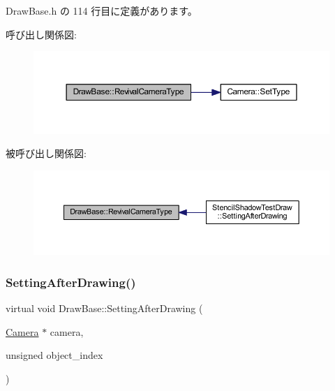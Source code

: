  Draw\+Base.\+h の 114 行目に定義があります。

呼び出し関係図\+:\nopagebreak
\begin{figure}[H]
\begin{center}
\leavevmode
\includegraphics[width=350pt]{class_draw_base_a48b144e61928b7658c7a849017e40c79_cgraph}
\end{center}
\end{figure}
被呼び出し関係図\+:\nopagebreak
\begin{figure}[H]
\begin{center}
\leavevmode
\includegraphics[width=350pt]{class_draw_base_a48b144e61928b7658c7a849017e40c79_icgraph}
\end{center}
\end{figure}
\mbox{\label{class_draw_base_afe64f27b0bbf8c45da7aa0de4c3f3d65}} 
\subsubsection{\texorpdfstring{Setting\+After\+Drawing()}{SettingAfterDrawing()}}
{\footnotesize\ttfamily virtual void Draw\+Base\+::\+Setting\+After\+Drawing (\begin{DoxyParamCaption}\item[{\mbox{\hyperlink{class_camera}{Camera}} $\ast$}]{camera,  }\item[{unsigned}]{object\+\_\+index }\end{DoxyParamCaption})\hspace{0.3cm}{\ttfamily [pure virtual]}}



